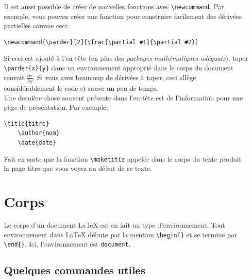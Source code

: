 \documentclass[12pt]{article}
\newcommand{\parder}[2]{\frac{\partial #1}{\partial #2}}
\begin{document}
	Il est aussi possible de créer de nouvelles fonctions avec \lstinline|\newcommand|. Par exemple, vous pouvez créer une fonction pour construire facilement des dérivées partielles comme ceci: \\
	
	\begin{lstlisting}[frame=single]
	\newcommand{\parder}[2]{\frac{\partial #1}{\partial #2}}
	\end{lstlisting}
	
	Si ceci est ajouté à l'en-tête (en plus des \textit{packages mathématiques adéquats}), taper \lstinline|\parder{x}{y}| dans un environnement approprié dans le corps du document renvoit $\parder{x}{y}$. Si vous avez beaucoup de dérivées à taper, ceci allège considérablement le code et sauve un peu de temps. \\
	
	Une dernière chose souvent présente dans l'en-tête est de l'information pour une page de présentation. Par exemple,
	\begin{lstlisting}[frame=single]
	\title{titre}
	\author{nom}
	\date{date}
	\end{lstlisting}
	
	Fait en sorte que la fonction \lstinline|\maketitle| appelée dans le corps du texte produit la page titre que vous voyez au début de ce texte.
	
	\section{Corps}
	
	Le corps d'un document LaTeX est en fait un type d'environnement. Tout environnement dans LaTeX débute par la mention \lstinline|\begin{}| et se termine par \lstinline|\end{}|. Ici, l'environnement est \lstinline|document|.
	
	\subsection{Quelques commandes utiles}
	
\end{document}

